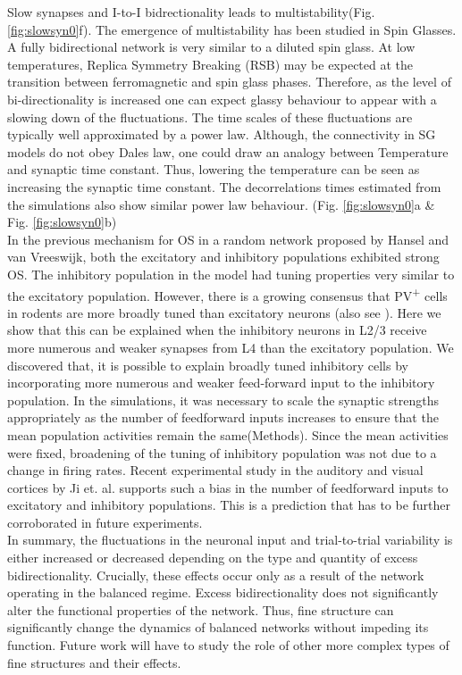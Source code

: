 Slow synapses and I-to-I bidrectionality leads to multistability(Fig. \ref{fig:slowsyn0}f). The emergence of multistability has been studied in Spin Glasses. A fully bidirectional network is very similar to a diluted spin glass\cite{megard1987spin}. At low temperatures, Replica Symmetry Breaking (RSB) may be expected at the transition between ferromagnetic and spin glass phases. Therefore, as the level of bi-directionality is increased one can expect glassy behaviour to appear with a slowing down of the fluctuations\cite{Crisanti1987, Crisanti1988}. The time scales of these fluctuations are typically well approximated by a power law. Although, the connectivity in SG models do not obey Dales law, one could draw an analogy between Temperature and synaptic time constant. Thus, lowering the temperature can be seen as increasing the synaptic time constant. The decorrelations times estimated from the simulations also show similar power law behaviour. (Fig. \ref{fig:slowsyn0}a \& Fig. \ref{fig:slowsyn0}b) \\

In the previous mechanism for OS in a random network proposed by Hansel and van Vreeswijk, both the excitatory and inhibitory populations exhibited strong OS. The inhibitory population in the model had tuning properties very similar to the excitatory population. However, there is a growing consensus that PV\textsuperscript{+} cells in rodents are more broadly tuned than excitatory neurons \cite{niell2008highly, kerlin2010broadly, liu2009visual, sohya2007gabaergic, kameyama2010difference} (also see \cite{Runyan2010, Ma2010}). Here we show that this can be explained when the inhibitory neurons in L2/3 receive more numerous and weaker synapses from L4 than the excitatory population.  We discovered that, it is possible to explain broadly tuned inhibitory cells by incorporating more numerous and weaker feed-forward input to the inhibitory population. In the simulations, it was necessary to scale the synaptic strengths appropriately as the number of feedforward inputs increases to ensure that the mean population activities remain the same(Methods). Since the mean activities were fixed, broadening of the tuning of inhibitory population was not due to a change in firing rates. Recent experimental study in the auditory and visual cortices by Ji et. al. \cite{Ji2015} supports such a bias in the number of feedforward inputs to excitatory and inhibitory populations. This is a prediction that has to be further corroborated in future experiments. \\

In summary, the fluctuations in the neuronal input and trial-to-trial variability is either increased or decreased depending on the type and quantity of excess bidirectionality. Crucially, these effects occur only as a result of the network operating in the balanced regime. Excess bidirectionality does not significantly alter the functional properties of the network. Thus, fine structure can significantly change the dynamics of balanced networks without impeding its function. Future work will have to study the role of other more complex types of fine structures and their effects. 